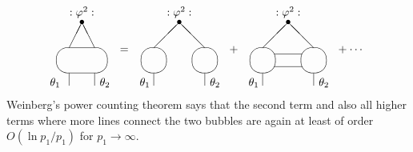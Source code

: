 \documentclass[a4paper,a4paper]{article}
\begin{document}
\[
\begin{array}{c}
\unitlength4mm\begin{picture}(4,6) \put(2,2){\oval(4,2)}
\put(2,5){\makebox(0,0){$\bullet$}}
\put(2,5.8){\makebox(0,0){$:\varphi^2:$}} \put(1,3){\line(1,2){1}}
\put(3,3){\line(-1,2){1}} \put(1,0){\line(0,1){1}} \put(3,0){\line(0,1){1}}
\put(-.5,0){$\theta_1$} \put(3.4,0){$\theta_2$} \end{picture}
\end{array}
~=~ 
\begin{array}{c}
\unitlength4mm\begin{picture}(6,6) \put(1,2){\oval(2,2)}
\put(5,2){\oval(2,2)} \put(3,5){\makebox(0,0){$\bullet$}}
\put(3,5.8){\makebox(0,0){$:\varphi^2:$}} \put(1,3){\line(1,1){2}}
\put(5,3){\line(-1,1){2}} \put(1,0){\line(0,1){1}} \put(5,0){\line(0,1){1}}
\put(-.1,0){$\theta_1$} \put(5.4,0){$\theta_2$} \end{picture}
\end{array}
~+~ 
\begin{array}{c}
\unitlength4mm\begin{picture}(6,6) \put(1,2){\oval(2,2)}
\put(5,2){\oval(2,2)} \put(3,5){\makebox(0,0){$\bullet$}}
\put(3,5.8){\makebox(0,0){$:\varphi^2:$}} \put(1,3){\line(1,1){2}}
\put(5,3){\line(-1,1){2}} \put(1,0){\line(0,1){1}} \put(5,0){\line(0,1){1}}
\put(-.1,0){$\theta_1$} \put(5.4,0){$\theta_2$}
\put(1.9,1.5){\line(1,0){2.2}} \put(1.9,2.5){\line(1,0){2.2}} \end{picture}
\end{array}
~+\cdots 
\]
Weinberg's power counting theorem says that the second term and also all
higher terms where more lines connect the two bubbles are again at least of
order $O(\ln p_{1}/p_{1})$ for $p_{1}\to \infty $.
\end{document}
